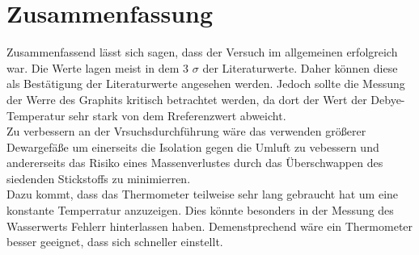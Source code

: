\section{Zusammenfassung}

Zusammenfassend lässt sich sagen, dass der Versuch im allgemeinen erfolgreich war.
Die Werte lagen meist in dem 3 $\sigma$ der Literaturwerte. Daher können diese als Bestätigung der Literaturwerte angesehen werden.
Jedoch sollte die Messung der Werre des Graphits kritisch betrachtet werden, da dort der Wert der Debye-Temperatur sehr stark von dem Rreferenzwert abweicht.\\

Zu verbessern an der Vrsuchsdurchführung wäre das verwenden größerer Dewargefäße um einerseits die Isolation gegen
die Umluft zu vebessern und andererseits das Risiko eines Massenverlustes durch das Überschwappen des siedenden Stickstoffs zu minimierren.\\
Dazu kommt, dass das Thermometer teilweise sehr lang gebraucht hat um eine konstante Temperratur anzuzeigen. Dies könnte besonders in der Messung des Wasserwerts Fehlerr hinterlassen haben.
Demenstprechend wäre ein Thermometer besser geeignet, dass sich schneller einstellt.
